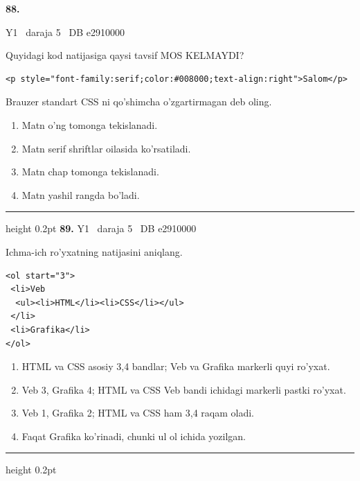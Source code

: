 \documentclass[10pt,a4paper,oneside]{article}
\begin{document}
\hypertarget{q88}{\textbf{\color{ink}88.}}  {\color{muted}\scriptsize Y1 \textbullet\ daraja 5 \textbullet\ DB e2910000}
\par
Quyidagi kod natijasiga qaysi tavsif MOS KELMAYDI?\par
\begin{lstlisting}
<p style="font-family:serif;color:#008000;text-align:right">Salom</p>
\end{lstlisting}
\par
Brauzer standart CSS ni qo'shimcha o'zgartirmagan deb oling.
\begin{enumerate}[label=\Alph*),leftmargin=9mm]
\item Matn o'ng tomonga tekislanadi.
\item Matn serif shriftlar oilasida ko'rsatiladi.
\item Matn chap tomonga tekislanadi.
\item Matn yashil rangda bo'ladi.
\end{enumerate}
\vspace{2mm}\hrule height 0.2pt \vspace{4mm}
\hypertarget{q89}{\textbf{\color{ink}89.}}  {\color{muted}\scriptsize Y1 \textbullet\ daraja 5 \textbullet\ DB e2910000}
\par
Ichma-ich ro'yxatning natijasini aniqlang.\par
\begin{lstlisting}
<ol start="3">
 <li>Veb
  <ul><li>HTML</li><li>CSS</li></ul>
 </li>
 <li>Grafika</li>
</ol>
\end{lstlisting}

\begin{enumerate}[label=\Alph*),leftmargin=9mm]
\item HTML va CSS asosiy 3,4 bandlar; Veb va Grafika markerli quyi ro'yxat.
\item Veb 3, Grafika 4; HTML va CSS Veb bandi ichidagi markerli pastki ro'yxat.
\item Veb 1, Grafika 2; HTML va CSS ham 3,4 raqam oladi.
\item Faqat Grafika ko'rinadi, chunki ul ol ichida yozilgan.
\end{enumerate}
\vspace{2mm}\hrule height 0.2pt \vspace{4mm}
\end{document}
